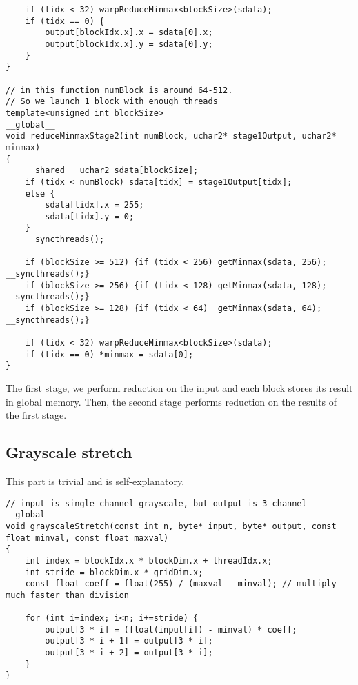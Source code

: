 \documentclass[14pt]{article}
\begin{document}
\begin{lstlisting}
    if (tidx < 32) warpReduceMinmax<blockSize>(sdata);
    if (tidx == 0) {
        output[blockIdx.x].x = sdata[0].x;
        output[blockIdx.x].y = sdata[0].y;
    }
}

// in this function numBlock is around 64-512.
// So we launch 1 block with enough threads
template<unsigned int blockSize>
__global__
void reduceMinmaxStage2(int numBlock, uchar2* stage1Output, uchar2* minmax)
{
    __shared__ uchar2 sdata[blockSize];    
    if (tidx < numBlock) sdata[tidx] = stage1Output[tidx];
    else {
        sdata[tidx].x = 255;
        sdata[tidx].y = 0;
    }
    __syncthreads();

    if (blockSize >= 512) {if (tidx < 256) getMinmax(sdata, 256); __syncthreads();}
    if (blockSize >= 256) {if (tidx < 128) getMinmax(sdata, 128); __syncthreads();}
    if (blockSize >= 128) {if (tidx < 64)  getMinmax(sdata, 64);  __syncthreads();}

    if (tidx < 32) warpReduceMinmax<blockSize>(sdata);
    if (tidx == 0) *minmax = sdata[0];
}
\end{lstlisting}

The first stage, we perform reduction on the input and each block stores its result in global memory. Then, the second stage performs reduction on the results of the first stage.

\subsection{Grayscale stretch}
This part is trivial and is self-explanatory.

\begin{lstlisting}
// input is single-channel grayscale, but output is 3-channel
__global__
void grayscaleStretch(const int n, byte* input, byte* output, const float minval, const float maxval)
{
    int index = blockIdx.x * blockDim.x + threadIdx.x;
    int stride = blockDim.x * gridDim.x;
    const float coeff = float(255) / (maxval - minval); // multiply much faster than division

    for (int i=index; i<n; i+=stride) {
        output[3 * i] = (float(input[i]) - minval) * coeff;
        output[3 * i + 1] = output[3 * i];
        output[3 * i + 2] = output[3 * i];
    }
}
\end{lstlisting}
\end{document}
